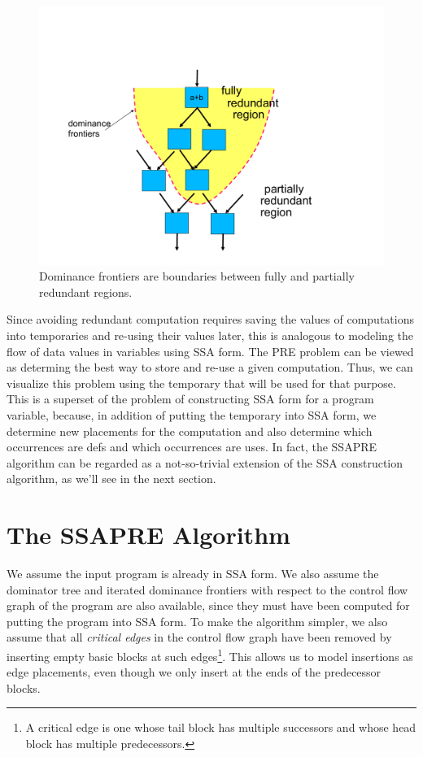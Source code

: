 \begin{figure}
\centering
\includegraphics[scale=0.35]{fig-ssapre-motive.pdf}
\caption{Dominance frontiers are boundaries between fully and partially redundant regions.}
\label{fig: ssapre-motive}
\end{figure}

Since avoiding redundant computation requires saving the values of 
computations into temporaries and re-using their values later, this is
analogous to modeling the flow of data values in variables using SSA form.
The PRE problem can be viewed as determing the best way to store and
re-use a given computation.  Thus, we can visualize this problem using
the temporary that will be used for that purpose.  This is a superset of
the problem of constructing SSA form for a program variable, because,
in addition of putting the temporary into SSA form, 
we determine new placements for the computation and also determine
which occurrences are defs and which occurrences are uses.  In fact, the
SSAPRE algorithm can be regarded as a not-so-trivial extension of the SSA 
construction algorithm, as we'll see in the next section.

\section{The SSAPRE Algorithm}

We assume the input program is already in SSA form.  We also assume 
the dominator tree and iterated dominance frontiers with
respect to the control flow graph of the program are also available, since
they must have been computed for putting the program into SSA form.
To make the algorithm simpler, we also assume that all \emph{critical edges}
in the control flow graph have been removed by inserting empty basic blocks
at such edges\footnote{A critical edge is one whose tail block has multiple
successors and whose head block has multiple predecessors.}\cite{Rosen88}.
This allows us to model insertions as edge placements, even though we only
insert at the ends of the predecessor blocks.

